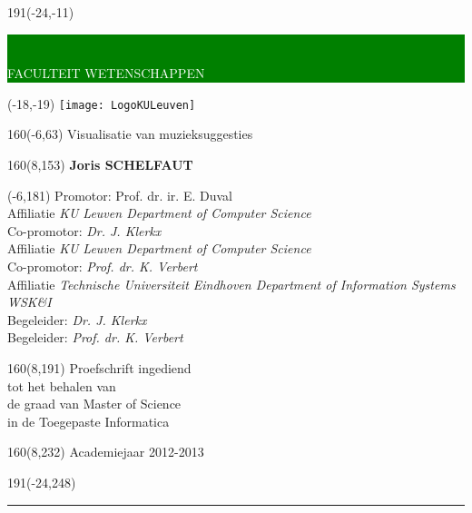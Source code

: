 \thispagestyle{empty}
\newcommand{\form}[1]{\scalebox{1.087}{\boldmath{#1}}}
\sffamily
%
\begin{textblock}{191}(-24,-11)
	\colorbox{green}{\hspace{129mm}\ \parbox[c][18truemm]{62mm}{\textcolor{white}{FACULTEIT WETENSCHAPPEN}}}
\end{textblock}
%
\begin{textblock}{70}(-18,-19)
	\textblockcolour{}
	\texttt{[image: LogoKULeuven]}
\end{textblock}
%
\begin{textblock}{160}(-6,63)
	\textblockcolour{}
	\vspace{-\parskip}
	\flushleft
	\fontsize{40}{42}\selectfont \textcolor{bluetitle}{Visualisatie van muzieksuggesties}\\[1.5mm]
	\fontsize{20}{22}\selectfont {Een visueel uitlegsysteem voor collaboratieve filtering}
\end{textblock}

\begin{textblock}{160}(8,153)
\textblockcolour{}
\vspace{-\parskip}
\flushright
\fontsize{14}{16}\selectfont \textbf{Joris SCHELFAUT}
\end{textblock}
%
\begin{textblock}{90}(-6,181)
\textblockcolour{}
\vspace{-\parskip}
\flushleft
Promotor: Prof. dr. ir. E. Duval\\[-2pt]
\textcolor{blueaff}{Affiliatie \textsl{KU Leuven Department of Computer Science}}\\[5pt]
Co-promotor: \textsl{Dr. J. Klerkx}\\[-2pt]
\textcolor{blueaff}{Affiliatie \textsl{KU Leuven Department of Computer Science}}\\[5pt]
Co-promotor: \textsl{Prof. dr. K. Verbert}\\[-2pt]
\textcolor{blueaff}{Affiliatie \textsl{Technische Universiteit Eindhoven Department of Information Systems WSK\&I}}\\[5pt]
Begeleider: \textsl{Dr. J. Klerkx}\\[-2pt]
Begeleider: \textsl{Prof. dr. K. Verbert}\\[-2pt]
\end{textblock}
%
\begin{textblock}{160}(8,191)
\textblockcolour{}
\vspace{-\parskip}
\flushright
Proefschrift ingediend\\[4.5pt]
tot het behalen van\\[4.5pt]
de graad van Master of Science\\[4.5pt]
in de Toegepaste Informatica\\
\end{textblock}
%
\begin{textblock}{160}(8,232)
\textblockcolour{}
\vspace{-\parskip}
\flushright
Academiejaar 2012-2013
\end{textblock}
%
\begin{textblock}{191}(-24,248)
{\color{blueline}\rule{550pt}{5.5pt}}
\end{textblock}
%
\vfill